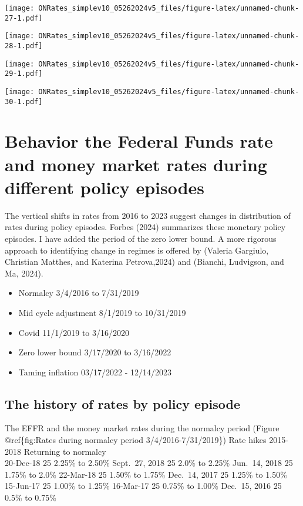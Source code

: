 \documentclass[
]{article}
\providecommand{\tightlist}{%
  \setlength{\itemsep}{0pt}\setlength{\parskip}{0pt}}
\begin{document}
\texttt{[image: ONRates\_simplev10\_05262024v5\_files/figure-latex/unnamed-chunk-27-1.pdf]}

\texttt{[image: ONRates\_simplev10\_05262024v5\_files/figure-latex/unnamed-chunk-28-1.pdf]}

\texttt{[image: ONRates\_simplev10\_05262024v5\_files/figure-latex/unnamed-chunk-29-1.pdf]}

\texttt{[image: ONRates\_simplev10\_05262024v5\_files/figure-latex/unnamed-chunk-30-1.pdf]}

\hypertarget{behavior-the-federal-funds-rate-and-money-market-rates-during-different-policy-episodes}{%
\section{Behavior the Federal Funds rate and money market rates during different policy episodes}\label{behavior-the-federal-funds-rate-and-money-market-rates-during-different-policy-episodes}}

The vertical shifts in rates from 2016 to 2023 suggest changes in distribution of rates during policy episodes. Forbes (2024) summarizes these monetary policy episodes. I have added the period of the zero lower bound. A more rigorous approach to identifying change in regimes is offered by (Valeria Gargiulo, Christian Matthes, and Katerina Petrova,2024) and (Bianchi, Ludvigson, and Ma, 2024).

\begin{itemize}
\tightlist
\item
  Normalcy 3/4/2016 to 7/31/2019\\
\item
  Mid cycle adjustment 8/1/2019 to 10/31/2019\\
\item
  Covid 11/1/2019 to 3/16/2020\\
\item
  Zero lower bound 3/17/2020 to 3/16/2022\\
\item
  Taming inflation 03/17/2022 - 12/14/2023
\end{itemize}

\hypertarget{the-history-of-rates-by-policy-episode}{%
\subsection{The history of rates by policy episode}\label{the-history-of-rates-by-policy-episode}}

The EFFR and the money market rates during the normalcy period (Figure @ref\{fig:Rates during normalcy period 3/4/2016-7/31/2019\})
Rate hikes 2015-2018 Returning to normalcy\\
20-Dec-18 25 2.25\% to 2.50\%
Sept.~27, 2018 25 2.0\% to 2.25\%
Jun.~14, 2018 25 1.75\% to 2.0\%
22-Mar-18 25 1.50\% to 1.75\%
Dec.~14, 2017 25 1.25\% to 1.50\%
15-Jun-17 25 1.00\% to 1.25\%
16-Mar-17 25 0.75\% to 1.00\%
Dec.~15, 2016 25 0.5\% to 0.75\%
\end{document}
